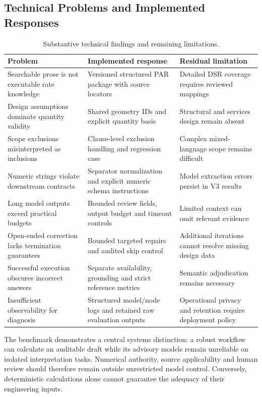 \documentclass[11pt,a4paper]{article}
\begin{document}
\subsection{Technical Problems and Implemented Responses}
\begin{table}[H]\caption{Substantive technical findings and remaining limitations.}\small
\begin{tabularx}{\linewidth}{p{.24\linewidth}XX}\toprule
Problem & Implemented response & Residual limitation \\\midrule
Searchable prose is not executable rate knowledge & Versioned structured PAR package with source locators & Detailed DSR coverage requires reviewed mappings \\
Design assumptions dominate quantity validity & Shared geometry IDs and explicit quantity basis & Structural and services design remain absent \\
Scope exclusions misinterpreted as inclusions & Clause-level exclusion handling and regression case & Complex mixed-language scope remains difficult \\
Numeric strings violate downstream contracts & Separator normalization and explicit numeric schema instructions & Model extraction errors persist in V3 results \\
Long model outputs exceed practical budgets & Bounded review fields, output budget and timeout controls & Limited context can omit relevant evidence \\
Open-ended correction lacks termination guarantees & Bounded targeted repairs and audited skip control & Additional iterations cannot resolve missing design data \\
Successful execution obscures incorrect answers & Separate availability, grounding and strict reference metrics & Semantic adjudication remains necessary \\
Insufficient observability for diagnosis & Structured model/node logs and retained raw evaluation outputs & Operational privacy and retention require deployment policy \\\bottomrule
\end{tabularx}\end{table}

The benchmark demonstrates a central systems distinction: a robust workflow can calculate an auditable draft while its advisory models remain unreliable on isolated interpretation tasks. Numerical authority, source applicability and human review should therefore remain outside unrestricted model control. Conversely, deterministic calculations alone cannot guarantee the adequacy of their engineering inputs.
\end{document}
